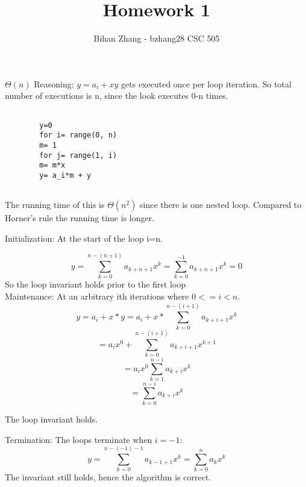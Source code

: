 \documentclass[12pt]{article}
\newenvironment{question}[2][Question]{\begin{trivlist}
		\item[\hskip \labelsep {\bfseries #1}\hskip \labelsep {\bfseries #2.}]}{\end{trivlist}}
\begin{document}
	
	
	
	\title{Homework 1}%
	\author{Bihan Zhang - bzhang28 %
		CSC 505} %
	
	\maketitle
	
	
	\begin{question}{1a} 
	$\Theta(n)$
	Reasoning: $y = a_i+ x  y$ gets executed once per loop iteration. So total number of executions is n, since the look executes 0-n times. 		
	\end{question}

	\begin{question}{1b} 
	\begin{lstlisting}
	
		y=0
		for i= range(0, n)
		m= 1
		for j= range(1, i)
		m= m*x
		y= a_i*m + y 
		
	\end{lstlisting}
	
	The running time of this is $\Theta(n^2)$ since there is one nested loop. Compared to Horner's rule the running time is longer.

	\end{question}
		
	\begin{question}{1c} 
	Initialization: At the start of the loop i=n. 

	$$y=\sum_{k=0}^{n-(n+1)}a_{k+n+1}x^k = \sum_{k=0}^{-1}a_{k+n+1}x^k = 0 $$ So the loop invariant holds prior to the first loop\\
	
	Maintenance: At an arbitrary ith iterations where $0<=i<n$.
	$$y=a_i+x*y = a_i+x*\sum_{k=0}^{n-(i+1)}a_{k+i+1}x^k$$
	$$=a_{i}x^{0}+\sum_{k=0}^{n-(i+1)}a_{k+i+1}x^{k+1}$$
	$$=a_{i}x^{0}\sum_{k=1}^{n-i}a_{k+i}x^{k}$$	
	$$=\sum_{k=0}^{n-i}a_{k+i}x^{k}$$
	
	The loop invariant holds.
	
	Termination: The loops terminate when $i=-1$:
	$$y=\sum_{k=0}^{n-(-1)-1}a_{k-1+1}x^{k}=\sum_{k=0}^{n}a_{k}x^{k}$$
	The invariant still holds, hence the algorithm is correct.
	\end{question}	
\end{document}

